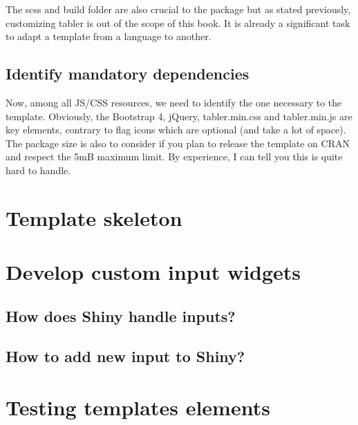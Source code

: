 \documentclass[]{book}
\begin{document}
The scss and build folder are also crucial to the package but as stated previously, customizing tabler is out of the scope of this book. It is already a significant task to adapt a template from a language to another.

\hypertarget{identify-mandatory-dependencies}{%
\section{Identify mandatory dependencies}\label{identify-mandatory-dependencies}}

Now, among all JS/CSS resources, we need to identify the one necessary to the template. Obviously, the Bootstrap 4, jQuery, tabler.min.css and tabler.min.js are key elements, contrary to flag icons which are optional (and take a lot of space). The package size is also to consider if you plan to release the template on CRAN and respect the 5mB maximum limit. By experience, I can tell you this is quite hard to handle.

\hypertarget{custom-templates-skeleton}{%
\chapter{Template skeleton}\label{custom-templates-skeleton}}

\hypertarget{custom-templates-inputs}{%
\chapter{Develop custom input widgets}\label{custom-templates-inputs}}

\hypertarget{how-does-shiny-handle-inputs}{%
\section{How does Shiny handle inputs?}\label{how-does-shiny-handle-inputs}}

\hypertarget{how-to-add-new-input-to-shiny}{%
\section{How to add new input to Shiny?}\label{how-to-add-new-input-to-shiny}}

\hypertarget{custom-templates-testing}{%
\chapter{Testing templates elements}\label{custom-templates-testing}}


\end{document}
